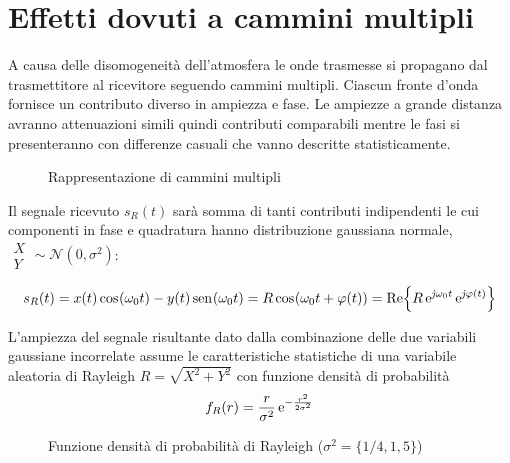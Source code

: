 \clearpage
\section{Effetti dovuti a cammini multipli}\label{cap:canale_radio_effetti_cammini_multipli}
A causa delle disomogeneità dell'atmosfera le onde trasmesse si propagano dal trasmettitore al ricevitore seguendo cammini multipli. Ciascun fronte d'onda fornisce un contributo diverso in ampiezza e fase. Le ampiezze a grande distanza avranno attenuazioni simili quindi contributi comparabili mentre le fasi si presenteranno con differenze casuali che vanno descritte statisticamente.
\begin{figure}[ht]\centering
	\caption{Rappresentazione di cammini multipli}
	\label{fig:cammini_multipli}
\end{figure}

Il segnale ricevuto $s_R(t)$ sarà somma di tanti contributi indipendenti le cui componenti in fase e quadratura hanno distribuzione gaussiana normale, $\begin{array}{c}X\\Y\end{array}\sim\mathcal{N}(0,\sigma^2)$:

\begin{equation}
s_R(t)=x(t)\,{\operatorname{cos}}^{}\!\left({\omega_0 t}\right)-y(t)\,{\operatorname{sen}}^{}\!\left({\omega_0 t}\right)=R\,{\operatorname{cos}}^{}\!\left({\omega_0 t+\varphi(t)}\right)=\operatorname{Re}\!\left\lbrace{R\operatorname{e}^{\operatorname{\mathit{j}\!}\omega_0 t}\operatorname{e}^{\operatorname{\mathit{j}\!}\varphi(t)}}\right\rbrace
\end{equation}

L'ampiezza del segnale risultante dato dalla combinazione delle due variabili gaussiane incorrelate assume le caratteristiche statistiche di una variabile aleatoria di Rayleigh $R=\sqrt{X^2+Y^2}$ con funzione densità di probabilità \[f_R(r)=\frac{r}{\sigma^2}\operatorname{e}^{-\frac{r^2}{2\sigma^2}}\]
\begin{figure}[ht!]\centering
	\caption{Funzione densità di probabilità di Rayleigh ($\sigma^2=\{1/4,1,5\}$)}
	\label{fig:funz_dens_prob_rayleigh}
\end{figure}

